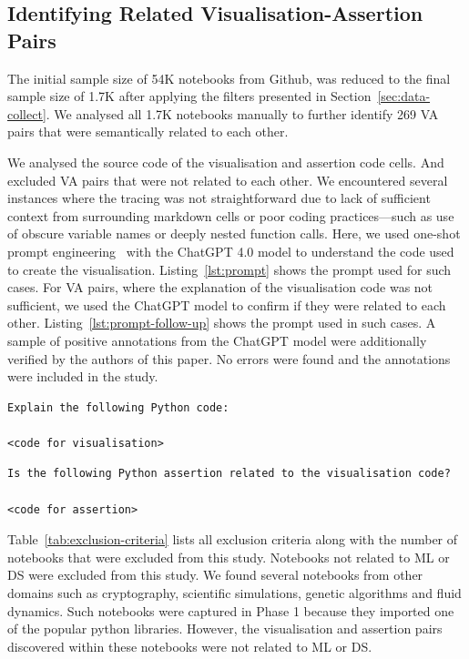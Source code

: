 \documentclass[conference]{IEEEtran}
\begin{document}
\subsection{Identifying Related Visualisation-Assertion Pairs}\label{sec:identify-related-pairs}

The initial sample size of 54K notebooks from Github, was reduced to the final sample size of 1.7K after applying the filters presented in Section~\ref{sec:data-collect}. We analysed all 1.7K notebooks manually to further identify 269 VA pairs that were semantically related to each other.

We analysed the source code of the visualisation and assertion code cells. And excluded VA pairs that were not related to each other. We encountered several instances where the tracing was not straightforward due to lack of sufficient context from surrounding markdown cells or poor coding practices---such as use of obscure variable names or deeply nested function calls. Here, we used one-shot prompt engineering~\cite{liu2023pretrain} with the ChatGPT 4.0 model to understand the code used to create the visualisation. Listing~\ref{lst:prompt} shows the prompt used for such cases. For VA pairs, where the explanation of the visualisation code was not sufficient, we used the ChatGPT model to confirm if they were related to each other. Listing~\ref{lst:prompt-follow-up} shows the prompt used in such cases. A sample of positive annotations from the ChatGPT model were additionally verified by the authors of this paper. No errors were found and the annotations were included in the study.

\begin{lstlisting}[caption={Prompt used for ChatGPT 4.0 model to understand visualisation code.}, label={lst:prompt}]
Explain the following Python code:

<code for visualisation>

\end{lstlisting}

\begin{lstlisting}[caption={Prompt used for ChatGPT 4.0 model to confirm if a VA pair are related to each other.}, label={lst:prompt-follow-up}]
Is the following Python assertion related to the visualisation code?

<code for assertion>

\end{lstlisting}

Table~\ref{tab:exclusion-criteria} lists all exclusion criteria along with the number of notebooks that were excluded from this study. Notebooks not related to ML or DS were excluded from this study. We found several notebooks from other domains such as cryptography, scientific simulations, genetic algorithms and fluid dynamics. Such notebooks were captured in Phase 1 because they imported one of the popular python libraries. However, the visualisation and assertion pairs discovered within these notebooks were not related to ML or DS.
\end{document}
